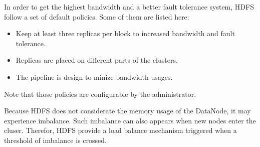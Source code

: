 \documentclass{article}
\begin{document}
In order to get the highest bandwidth and a better fault tolerance system, HDFS follow a set of default policies.
Some of them are listed here:
\begin{itemize}
\item Keep at least three replicas per block to increased bandwidth and fault tolerance.
\item Replicas are placed on different parts of the clusters.
\item The pipeline is design to minize bandwidth usages.
\end{itemize}

Note that those policies are configurable by the administrator.

Because HDFS does not considerate the memory usage of the DataNode, it may experience imbalance.
Such imbalance can also appears when new nodes enter the cluser.
Therefor, HDFS provide a load balance mechanism triggered when a threshold of imbalance is crossed.
\end{document}
